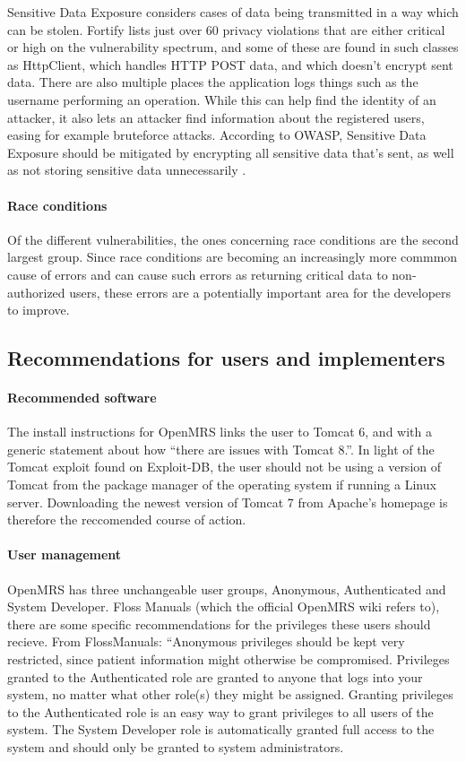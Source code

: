 \documentclass{report} %
\begin{document}
Sensitive Data Exposure considers cases of data being transmitted in a way which
can be stolen. Fortify lists just over 60 privacy violations that are either critical
or high on the vulnerability spectrum, and some of these are found in such
classes as HttpClient, which handles HTTP POST data, and which doesn't encrypt sent
data. There are also multiple places the application logs things such as the
username performing an operation. While this can help find the identity of
an attacker, it also lets an attacker find information about the registered
users, easing for example bruteforce attacks.
According to OWASP, Sensitive Data Exposure should be mitigated by encrypting
all sensitive data that's sent, as well as not storing sensitive data
unnecessarily \autocite[]{owasptop10}.


\paragraph{Race conditions}
Of the different vulnerabilities, the ones concerning race conditions are 
the second largest group. Since race conditions are becoming an increasingly
more commmon cause of errors and can cause such errors as returning critical
data to non-authorized users, these errors are a potentially important area for
the developers to improve.

\subsection{Recommendations for users and implementers}
\paragraph{Recommended software}
The install instructions for OpenMRS links the user to Tomcat 6, and with a
generic statement about how ``there are issues with Tomcat 8.''. In light of the
Tomcat exploit found on Exploit-DB, the user should not be using a version of Tomcat
from the package manager of the operating system if running a Linux server.
Downloading the newest version of Tomcat 7 from Apache's homepage is therefore
the reccomended course of action.

\paragraph{User management}
OpenMRS has three unchangeable user groups, Anonymous, Authenticated and System
Developer. Floss Manuals (which the official OpenMRS wiki refers to), there are
some specific recommendations for the privileges these users should recieve.
From FlossManuals: ``Anonymous privileges should be kept very restricted, since patient
information might otherwise be compromised. Privileges granted to the
Authenticated role are granted to anyone that logs into your system, no matter
what other role(s) they might be assigned. Granting privileges to the
Authenticated role is an easy way to grant privileges to all users of the
system. The System Developer role is automatically granted full access to the
system and should only be granted to system administrators.
\end{document}
